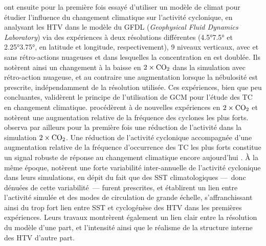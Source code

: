 \documentclass[../main.tex]{subfiles}
\begin{document}
\cite{broccoli_can_1990} ont ensuite pour la première fois essayé d'utiliser un modèle de climat pour étudier l'influence du changement climatique sur
l'activité cyclonique, en analysant les HTV dans le modèle du GFDL (\textit{Geophysical Fluid Dynamics Laboratory}) via des expériences à deux résolutions
différentes (\ang{4.5}\times\ang{7.5} et \ang{2.25}\times\ang{3.75}, en latitude et longitude, respectivement), \num{9} niveaux verticaux, avec et sans
rétro-actions nuageuses et dans lesquelles la concentration en  est doublée. Ils notèrent ainsi un changement à la baisse en
\ensuremath{2\times\ce{CO2}} dans la simulation avec rétro-action nuageuse, et au contraire une augmentation lorsque la nébulosité est prescrite, indépendamment
de la résolution utilisée. Ces expériences, bien que peu concluantes, validèrent le principe de l'utilisation de GCM pour l'étude des TC en changement
climatique. \cite{haarsma_tropical_1993,bengtsson_will_1996} procédèrent à de nouvelles expériences en \ensuremath{2\times\ce{CO2}} et notèrent une augmentation
relative de la fréquence des cyclones les plus forts. \cite{bengtsson_will_1996} observa par ailleurs pour la première fois une réduction de l'activité dans la
simulation \ensuremath{2\times\ce{CO2}}. Une réduction de l'activité cyclonique accompagnée d'une augmentation relative de la fréquence d'occurrence des TC les
plus forts constitue un signal robuste de réponse au changement climatique encore aujourd'hui \parencite[][voir
\cref{sec:projections_futures}]{walsh_tropical_2016,camargo_tropical_2016,knutson_tropical_2010,christensen_climate_2013,seneviratne_weather_2021}. À la même
époque, \cite{bengtsson_hurricanetype_1995} notèrent une forte variabilité inter-annuelle de l'activité cyclonique dans leurs simulations, en dépit du fait que
des SST climatologiques ---~donc dénuées de cette variabilité~--- furent prescrites, et établirent un lien entre l'activité simulée et des modes de circulation
de grande échelle, s'affranchissant ainsi du trop fort lien entre SST et cyclogénèse des HTV dans les premières expériences. Leurs travaux montrèrent également
un lien clair entre la résolution du modèle d'une part, et l'intensité ainsi que le réalisme de la structure interne des HTV d'autre part.
\end{document}
